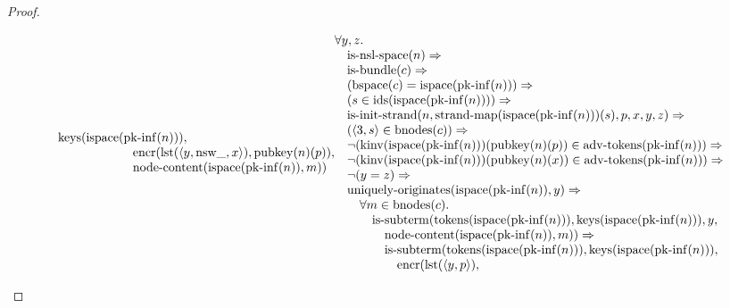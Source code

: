 \documentclass[11pt]{article}
\theoremstyle{plain}
\begin{document}
\begin{proof}
\begin{itemize}[leftmargin=2.8em, itemsep=4pt, parsep=1pt]
\begin{itemize}[leftmargin=2.8em, itemsep=4pt, parsep=1pt]
\begin{equation*}
\begin{array}{@{}l@{}}
\operatorname{keys}(\operatorname{ispace}(\operatorname{pk\text{-}inf}(n))), \\ \quad \quad \quad \quad \quad \quad \operatorname{encr}(\operatorname{lst}(\langle y, \operatorname{nsw\_}, x \rangle), \operatorname{pubkey}(n)(p)), \\ \quad \quad \quad \quad \quad \quad \operatorname{node\text{-}content}(\operatorname{ispace}(\operatorname{pk\text{-}inf}(n)), m)) \end{array} \\
\begin{array}{@{}l@{}} \forall y, z. \\ \quad \operatorname{is\text{-}nsl\text{-}space}(n) \Rightarrow  \\ \quad \operatorname{is\text{-}bundle}(c) \Rightarrow  \\ \quad (\operatorname{bspace}(c) = \operatorname{ispace}(\operatorname{pk\text{-}inf}(n))) \Rightarrow  \\ \quad (s \in \operatorname{ids}(\operatorname{ispace}(\operatorname{pk\text{-}inf}(n)))) \Rightarrow  \\ \quad \operatorname{is\text{-}init\text{-}strand}(n, \operatorname{strand\text{-}map}(\operatorname{ispace}(\operatorname{pk\text{-}inf}(n)))(s), p, x, y, z) \Rightarrow  \\ \quad (\langle 3, s \rangle \in \operatorname{bnodes}(c)) \Rightarrow  \\ \quad \neg (\operatorname{kinv}(\operatorname{ispace}(\operatorname{pk\text{-}inf}(n)))(\operatorname{pubkey}(n)(p)) \in \operatorname{adv\text{-}tokens}(\operatorname{pk\text{-}inf}(n))) \Rightarrow  \\ \quad \neg (\operatorname{kinv}(\operatorname{ispace}(\operatorname{pk\text{-}inf}(n)))(\operatorname{pubkey}(n)(x)) \in \operatorname{adv\text{-}tokens}(\operatorname{pk\text{-}inf}(n))) \Rightarrow  \\ \quad \neg (y = z) \Rightarrow  \\ \quad \operatorname{uniquely\text{-}originates}(\operatorname{ispace}(\operatorname{pk\text{-}inf}(n)), y) \Rightarrow  \\ \quad \quad \forall m \in \operatorname{bnodes}(c). \\ \quad \quad \quad \operatorname{is\text{-}subterm}(\operatorname{tokens}(\operatorname{ispace}(\operatorname{pk\text{-}inf}(n))), \operatorname{keys}(\operatorname{ispace}(\operatorname{pk\text{-}inf}(n))), y, \\ \quad \quad \quad \quad \operatorname{node\text{-}content}(\operatorname{ispace}(\operatorname{pk\text{-}inf}(n)), m)) \Rightarrow \\ \quad \quad \quad \quad \operatorname{is\text{-}subterm}(\operatorname{tokens}(\operatorname{ispace}(\operatorname{pk\text{-}inf}(n))), \operatorname{keys}(\operatorname{ispace}(\operatorname{pk\text{-}inf}(n))), \\ \quad \quad \quad \quad \quad \operatorname{encr}(\operatorname{lst}(\langle y, p \rangle), 
\end{array}
\end{equation*}
\end{itemize}
\end{itemize}
\end{proof}
\end{document}
